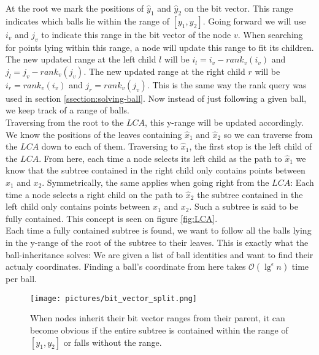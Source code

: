 At the root we mark the positions of $\hat{y}_1$ and $\hat{y}_2$ on the bit vector. This range indicates which balls lie within the range of $[y_1, y_2]$. Going forward we will use $i_v$ and $j_v$ to indicate this range in the bit vector of the node $v$. When searching for points lying within this range, a node will update this range to fit its children. The new updated range at the left child $l$ will be $i_l = i_v - rank_v(i_v)$ and $j_l = j_v - rank_v(j_v)$. The new updated range at the right child $r$ will be $i_r = rank_v(i_v)$ and $j_r = rank_v(j_v)$. This is the same way the rank query was used in section \ref{ssection:solving-ball}. Now instead of just following a given ball, we keep track of a range of balls. \\

Traversing from the root to the $LCA$, this y-range will be updated accordingly. We know the positions of the leaves containing $\hat{x}_1$ and $\hat{x}_2$ so we can traverse from the $LCA$ down to each of them. Traversing to $\hat{x}_1$, the first stop is the left child of the $LCA$. From here, each time a node selects its left child as the path to $\hat{x}_1$ we know that the subtree contained in the right child only contains points between $x_1$ and $x_2$. Symmetrically, the same applies when going right from the $LCA$: Each time a node selects a right child on the path to $\hat{x}_2$ the subtree contained in the left child only contains points between $x_1$ and $x_2$. Such a subtree is said to be fully contained. This concept is seen on figure \ref{fig:LCA}. \\

Each time a fully contained subtree is found, we want to follow all the balls lying in the y-range of the root of the subtree to their leaves. This is exactly what the ball-inheritance solves: We are given a list of ball identities and want to find their actualy coordinates. Finding a ball's coordinate from here takes $\mathcal{O}(\lg^\epsilon n)$ time per ball.

\begin{figure}[H]
    \centering
    \texttt{[image: pictures/bit\_vector\_split.png]}
    \caption{When nodes inherit their bit vector ranges from their parent, it can become obvious if the entire subtree is contained within the range of $[y_1, y_2]$ or falls without the range.}
    \label{fig:bitvectorsplit}
\end{figure}


